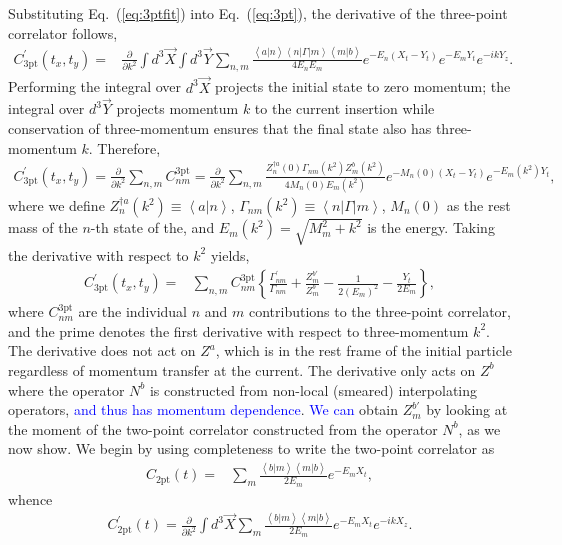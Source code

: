 \documentclass{PoS}
\newcommand{\kno}[1]{\textcolor{blue}{#1}}
\begin{document}
Substituting Eq.~(\ref{eq:3ptfit}) into Eq.~(\ref{eq:3pt}), the derivative of the three-point correlator follows,
\begin{align}
C^\prime_{\text{3pt}}(t_x, t_y) = & \frac{\partial}{\partial k^2} \int d^3\vec{X} \int d^3\vec{Y} \sum_{n,m} \frac{\left<a | n\right>\left<n| \Gamma |m\right>\left<m | b\right>}{4E_n E_m} e^{-E_n(X_t - Y_t)} e^{-E_m Y_t} e^{-ikY_z}.
\end{align}
Performing the integral over $d^3\vec{X}$ projects the initial state to zero momentum; the integral over $d^3 \vec{Y}$ projects momentum $k$ to the current insertion while conservation of three-momentum ensures that the final state also has three-momentum $k$. Therefore,
\begin{align}
C^\prime_{\text{3pt}}(t_x, t_y) = \frac{\partial}{\partial k^2} \sum_{n,m} C_{nm}^{\text{3pt}} = \frac{\partial}{\partial k^2} \sum_{n,m} \frac{Z_n^{\dagger a}(0) \Gamma_{nm}(k^2)Z_m^b(k^2)}{4 M_n(0) E_m(k^2)} e^{-M_n(0)(X_t - Y_t)} e^{-E_m(k^2) Y_t},
\end{align}
where we define $Z_n^{\dagger a}(k^2) \equiv\left<a|n\right>$, $\Gamma_{nm}(k^2) \equiv \left<n| \Gamma | m \right>$, $M_n(0)$ as the rest mass of the $n$-th state of the, and $E_m(k^2) = \sqrt{M_m^2+k^2}$ is the energy. Taking the derivative with respect to $k^2$ yields,
\begin{align}
C^\prime_{\text{3pt}}(t_x, t_y) = &\sum_{n,m} C^{\text{3pt}}_{nm}\left\{ \frac{\Gamma_{nm}^\prime}{\Gamma_{nm}} + \frac{Z^{b\prime}_m}{Z^b_m} - \frac{1}{2(E_m)^2} -\frac{Y_t}{2E_m}\right\} \label{3ptmomentfit},
\end{align}
where $C_{nm}^{\text{3pt}}$ are the individual $n$ and $m$ contributions to the three-point correlator, and the prime denotes the first derivative with respect to three-momentum $k^2$. The derivative does not act on $Z^a$, which is in the rest frame of the initial particle regardless of momentum transfer at the current. The derivative only acts on $Z^b$ where the operator $N^b$ is constructed from non-local (smeared) interpolating operators, \kno{and thus has momentum dependence}. \kno{We can} obtain $Z_m^{b\prime}$ by looking at the moment of the two-point correlator constructed from the operator $N^b$, as we now show. We begin by using completeness to write the two-point correlator as
\begin{align}
C_{\text{2pt}}(t)= & \sum_m \frac{\left<b | m\right>\left<m | b\right>}{2E_m} e^{-E_m X_t} \label{eq:2ptfit},
\end{align}
whence
\begin{align}
C^\prime_{\text{2pt}}(t)=\frac{\partial}{\partial k^2} \int d^3\vec{X} \sum_m \frac{\left<b | m\right>\left<m | b\right>}{2E_m} e^{-E_m X_t} e^{-ikX_z}.
\label{eq:2ptprime}
\end{align}
\end{document}
